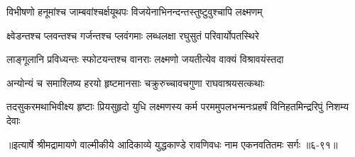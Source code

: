 \twolineshloka
{विभीषणो हनूमांश्च जाम्बवांश्चर्क्षयूथपः}
{विजयेनाभिनन्दन्तस्तुष्टुवुश्चापि लक्ष्मणम्} %

\twolineshloka
{क्ष्वेडन्तश्च प्लवन्तश्च गर्जन्तश्च प्लवंगमाः}
{लब्धलक्षा रघुसुतं परिवार्योपतस्थिरे} %

\twolineshloka
{लाङ्गूलानि प्रविध्यन्तः स्फोटयन्तश्च वानराः}
{लक्ष्मणो जयतीत्येव वाक्यं विश्रावयंस्तदा} %

\twolineshloka
{अन्योन्यं च समाश्लिष्य हरयो हृष्टमानसाः}
{चक्रुरुच्चावचगुणा राघवाश्रयसत्कथाः} %

\twolineshloka
{तदसुकरमथाभिवीक्ष्य हृष्टाः प्रियसुहृदो युधि लक्ष्मणस्य कर्म}
{परममुपलभन्मनःप्रहर्षं विनिहतमिन्द्ररिपुं निशम्य देवाः} %


॥इत्यार्षे श्रीमद्रामायणे वाल्मीकीये आदिकाव्ये युद्धकाण्डे रावणिवधः नाम एकनवतितमः सर्गः ॥६-९१॥
